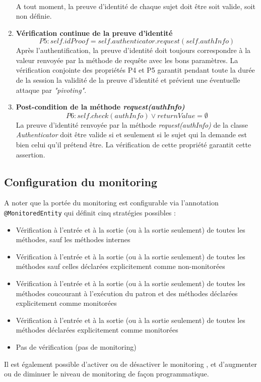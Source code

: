 \begin{enumerate}
\begin{equation*}
\begin{split}
      \end{split}
    \end{equation*}
    A tout moment, la preuve d’identité de chaque sujet doit être soit valide, soit non définie. 
    \\
    \item \textbf{Vérification continue de la preuve d'identité}
    \begin{equation*}
        P5: self.idProof = self.authenticator.request(self.authInfo)
    \end{equation*}
    Après l'authentification, la preuve d'identité doit toujours correspondre à la valeur renvoyée par la méthode de requête avec les bons paramètres. La vérification conjointe des propriétés P4 et P5 garantit pendant toute la durée de la session la validité de la preuve d'identité et prévient une éventuelle attaque par \textit{"pivoting"}.
    \\
    \item \textbf{Post-condition de la méthode \textit{request(authInfo)}}
    \begin{equation*}
        P6: self.check(authInfo) \lor returnValue = \emptyset
    \end{equation*}
    La preuve d'identité renvoyée par la méthode \textit{request(authInfo)} de la classe \textit{Authenticator} doit être valide si et seulement si le sujet qui la demande est bien celui qu'il prétend être. La vérification de cette propriété garantit cette assertion. 
 \end{enumerate}

\subsection{Configuration du monitoring}
\label{subsec:conf-monitoring}


A noter que la portée du monitoring est configurable via l'annotation \texttt{@MonitoredEntity} qui définit cinq stratégies possibles :
\begin{itemize}
    \item Vérification à l'entrée et à la sortie (ou à la sortie seulement) de toutes les méthodes, sauf les méthodes internes
    \item Vérification à l'entrée et à la sortie (ou à la sortie seulement) de toutes les méthodes sauf celles déclarées explicitement comme non-monitorées
    \item Vérification à l'entrée et à la sortie (ou à la sortie seulement) de toutes les méthodes coucourant à l'exécution du patron et des méthodes déclarées explicitement comme monitorées
    \item Vérification à l'entrée et à la sortie (ou à la sortie seulement) de toutes les méthodes déclarées explicitement comme monitorées
    \item Pas de vérification (pas de monitoring)
\end{itemize}
Il est également possible d'activer ou de désactiver le monitoring , et d'augmenter ou de diminuer le niveau de monitoring de façon programmatique.

